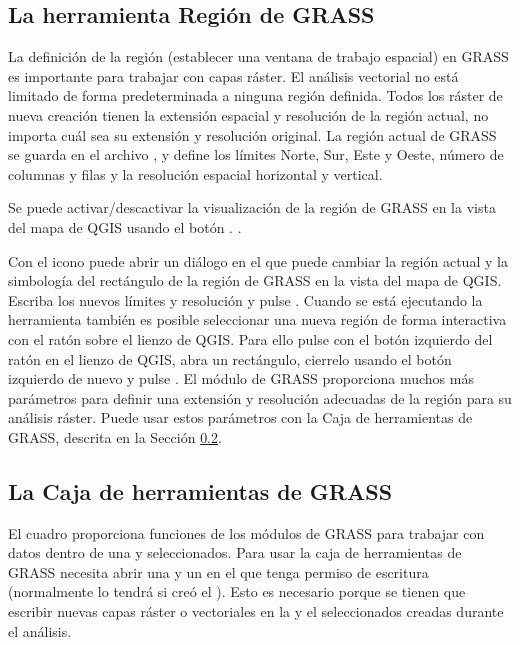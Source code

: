 \subsection{La herramienta Región de GRASS}\label{sec:grass_region}

La definición de la región (establecer una ventana de trabajo espacial) en GRASS es importante para trabajar con capas
ráster. El análisis vectorial no está limitado de forma predeterminada a ninguna región definida. Todos los ráster de nueva 
creación tienen la extensión espacial y resolución de la región actual, no importa cuál sea su extensión y resolución original. La región actual de GRASS se guarda en el archivo , y define los límites Norte, Sur, Este y Oeste, número de columnas y filas y la resolución espacial horizontal y vertical.

Se puede activar/descactivar la visualización de la región de GRASS en la vista del mapa de QGIS usando el botón 
. .

Con el icono  puede abrir un diálogo en el que puede 
cambiar la región actual y la simbología del rectángulo de la región de GRASS en la vista del mapa de QGIS. Escriba
los nuevos límites y resolución y pulse . Cuando se está ejecutando la herramienta también es posible 
seleccionar una nueva región de forma interactiva con el ratón sobre el lienzo de QGIS.
Para ello pulse con el botón 
izquierdo del ratón en el lienzo de QGIS, abra un rectángulo, cierrelo usando el botón izquierdo de nuevo y pulse 
.
El módulo de GRASS  proporciona muchos más parámetros para definir una extensión y resolución adecuadas
de la región para su análisis ráster. Puede usar estos parámetros con la Caja de herramientas de GRASS, descrita en la Sección 
\ref{subsec:grass_toolbox}.

\subsection{La Caja de herramientas de GRASS}\label{subsec:grass_toolbox}

El cuadro  proporciona funciones de los módulos de GRASS para trabajar 
con datos dentro de una  y  seleccionados. Para usar la caja 
de herramientas de GRASS necesita abrir una  y un  en el que 
tenga permiso de escritura (normalmente lo tendrá si creó el ). Esto es necesario porque 
se tienen que escribir nuevas capas ráster o vectoriales en la  y el  
seleccionados creadas durante el análisis.

